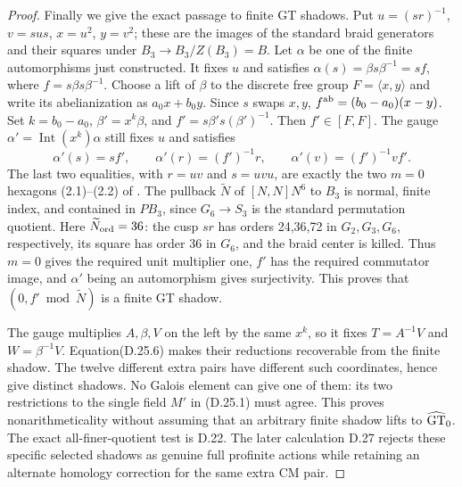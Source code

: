 \begin{proof}
Finally we give the exact passage to finite GT shadows.
Put $u=(sr)^{-1}$, $v=sus$, $x=u^2$, $y=v^2$; these are
the images of the standard braid generators and their
squares under $B_3\to B_3/Z(B_3)=B$.
Let $\alpha$ be one of the finite automorphisms just constructed.
It fixes $u$ and satisfies
$\alpha(s)=\beta s\beta^{-1}=sf$, where
$f=s\beta s\beta^{-1}$. Choose a lift of $\beta$ to the
discrete free group $F=\langle x,y\rangle$ and write its
abelianization as $a_0x+b_0y$. Since $s$ swaps $x,y$,
$f^{\rm ab}=(b_0-a_0)(x-y)$.
Set $k=b_0-a_0$, $\beta'=x^k\beta$, and
$f'=s\beta's(\beta')^{-1}$. Then $f'\in[F,F]$.
The gauge $\alpha'=\operatorname{Int}(x^k)\alpha$ still
fixes $u$ and satisfies
\[
 \alpha'(s)=sf',\qquad\alpha'(r)=(f')^{-1}r,
 \qquad\alpha'(v)=(f')^{-1}vf'.                           \tag{D.25.7}
\]
The last two equalities, with $r=uv$ and $s=uvu$, are
exactly the two $m=0$ hexagons (2.1)--(2.2) of
\cite[Definitions2.1 and 2.3]{dBDHP2026}.
The pullback $\widetilde N$ of $[N,N]N^6$ to $B_3$ is
normal, finite index, and contained in $PB_3$, since
$G_6\to S_3$ is the standard permutation quotient.
Here $\widetilde N_{\rm ord}=36$: the cusp $sr$ has orders
24,36,72 in $G_2,G_3,G_6$, respectively, its square has
order 36 in $G_6$, and the braid center is killed.
Thus $m=0$ gives the required unit multiplier one,
$f'$ has the required commutator image, and $\alpha'$ being
an automorphism gives surjectivity. This proves that
$(0,f'\bmod\widetilde N)$ is a finite GT shadow.

The gauge multiplies $A,\beta,V$ on the left by the same
$x^k$, so it fixes $T=A^{-1}V$ and $W=\beta^{-1}V$.
Equation(D.25.6) makes their reductions recoverable from
the finite shadow. The twelve different extra pairs have
different such coordinates, hence give distinct shadows.
No Galois element can give one of them: its two restrictions
to the single field $M'$ in (D.25.1) must agree. This proves
nonarithmeticality without assuming that an arbitrary
finite shadow lifts to $\widehat{\rm GT}_0$.
The exact all-finer-quotient test is D.22. The later
calculation D.27 rejects these specific selected shadows
as genuine full profinite actions while retaining an
alternate homology correction for the same extra CM pair.
\end{proof}
